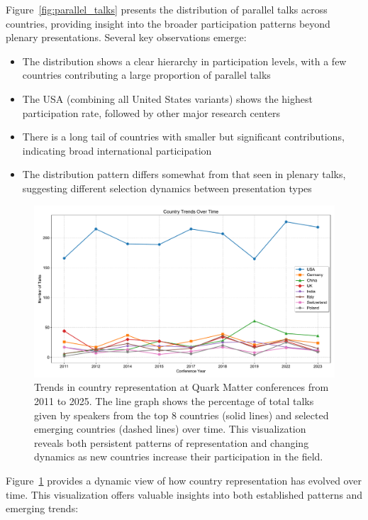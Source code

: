 \documentclass[a4paper,11pt]{article}
\begin{document}
Figure~\ref{fig:parallel_talks} presents the distribution of parallel talks across countries, providing insight into the broader participation patterns beyond plenary presentations. Several key observations emerge:

\begin{itemize}
    \item The distribution shows a clear hierarchy in participation levels, with a few countries contributing a large proportion of parallel talks
    \item The USA (combining all United States variants) shows the highest participation rate, followed by other major research centers
    \item There is a long tail of countries with smaller but significant contributions, indicating broad international participation
    \item The distribution pattern differs somewhat from that seen in plenary talks, suggesting different selection dynamics between presentation types
\end{itemize}

\begin{figure}[H]
\centering
\includegraphics[width=\textwidth]{figures/country_trends_over_time.pdf}
\caption{Trends in country representation at Quark Matter conferences from 2011 to 2025. The line graph shows the percentage of total talks given by speakers from the top 8 countries (solid lines) and selected emerging countries (dashed lines) over time. This visualization reveals both persistent patterns of representation and changing dynamics as new countries increase their participation in the field.}
\label{fig:country_trends}
\end{figure}

Figure~\ref{fig:country_trends} provides a dynamic view of how country representation has evolved over time. This visualization offers valuable insights into both established patterns and emerging trends:
\end{document}
